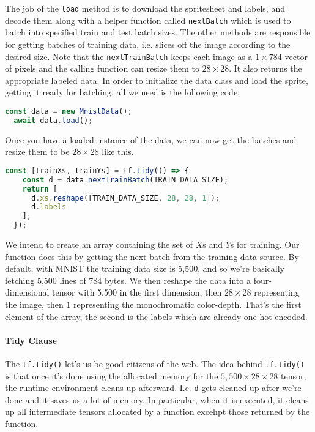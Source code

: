 \documentclass[12pt]{article}
\begin{document}
The job of the \texttt{load} method is to download the spritesheet and labels, and decode them along with a helper function called \texttt{nextBatch} which is used to batch into specified train and test batch sizes. The other methods are responsible for getting batches of training data, i.e. slices off the image according to the desired size. Note that the \texttt{nextTrainBatch} keeps each image as a $1 \times 784$ vector of pixels and the calling function can resize them to $28 \times 28$. It also returns the appropriate labeled data. In order to initialize the data class and load the sprite, getting it ready for batching, all we need is the following code.
\begin{lstlisting}[language=JavaScript]
  const data = new MnistData();
  await data.load();
\end{lstlisting}
Once you have a loaded instance of the data, we can now get the batches and resize them to be $28 \times 28$ like this.
\begin{lstlisting}[language=JavaScript]
  const [trainXs, trainYs] = tf.tidy(() => {
    const d = data.nextTrainBatch(TRAIN_DATA_SIZE);
    return [
      d.xs.reshape([TRAIN_DATA_SIZE, 28, 28, 1]);
      d.labels
    ];
  });
\end{lstlisting}
We intend to create an array containing the set of $X$s and $Y$s for training. Our function does this by getting the next batch from the training data source. By default, with MNIST the training data size is 5,500, and so we're basically fetching 5,500 lines of 784 bytes. We then reshape the data into a four-dimensional tensor with 5,500 in the first dimension, then $28 \times 28$ representing the image, then $1$ representing the monochromatic color-depth. That's the first element of the array, the second is the labels which are already one-hot encoded.

\paragraph{Tidy Clause} The \texttt{tf.tidy()} let's us be good citizens of the web. The idea behind \texttt{tf.tidy()} is that once it's done using the allocated memory for the $5,500 \times 28 \times 28$ tensor, the runtime environment cleans up afterward. I.e. \texttt{d} gets cleaned up after we're done and it saves us a lot of memory. In particular, when it is executed, it cleans up all intermediate tensors allocated by a function excehpt those returned by the function.
\end{document}
